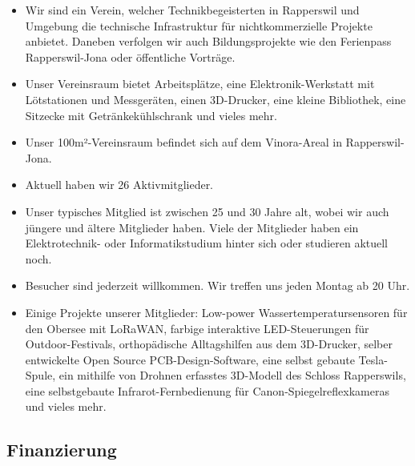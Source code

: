 \documentclass[10pt,a4paper,parskip,fleqn]{scrartcl}
\newcommand{\membercount}{26}
\begin{document}
\begin{itemize}
	\item Wir sind ein Verein, welcher Technikbegeisterten in Rapperswil und
		Umgebung die technische Infrastruktur für nichtkommerzielle Projekte
		anbietet. Daneben verfolgen wir auch Bildungsprojekte wie den Ferienpass
		Rapperswil-Jona oder öffentliche Vorträge.
	\item Unser Vereinsraum bietet Arbeitsplätze, eine Elektronik-Werkstatt mit
		Lötstationen und Messgeräten, einen 3D-Drucker, eine kleine Bibliothek, eine
		Sitzecke mit Getränkekühlschrank und vieles mehr.
	\item Unser 100m²-Vereinsraum befindet sich auf dem Vinora-Areal in
		Rapperswil-Jona.
	\item Aktuell haben wir \membercount{} Aktivmitglieder.
	\item Unser typisches Mitglied ist zwischen 25 und 30 Jahre alt, wobei wir
		auch jüngere und ältere Mitglieder haben. Viele der Mitglieder haben ein
		Elektrotechnik- oder Informatikstudium hinter sich oder studieren aktuell
		noch.
	\item Besucher sind jederzeit willkommen. Wir treffen uns jeden Montag ab 20
		Uhr.
	\item Einige Projekte unserer Mitglieder: Low-power Wassertemperatursensoren
		für den Obersee mit LoRaWAN, farbige interaktive LED-Steuerungen für
		Outdoor-Festivals, orthopädische Alltagshilfen aus dem 3D-Drucker, selber
		entwickelte Open Source PCB-Design-Software, eine selbst gebaute
		Tesla-Spule, ein mithilfe von Drohnen erfasstes 3D-Modell des Schloss
		Rapperswils, eine selbstgebaute Infrarot-Fernbedienung für
		Canon-Spiegelreflexkameras und vieles mehr.
\end{itemize}

\subsection{Finanzierung}
\end{document}
